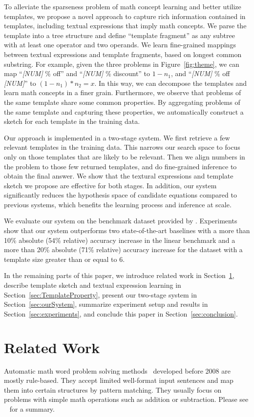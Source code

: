 \documentclass[11pt,letterpaper]{article}
\begin{document}
To alleviate the sparseness problem of math concept learning and better utilize templates, we propose a novel approach to capture rich information contained in templates, including textual expressions that imply math concepts. We parse the template into a tree structure and define ``template fragment'' as any subtree with at least one operator and two operands. We learn fine-grained mappings between textual expressions and template fragments, based on longest common substring. For example, given the three problems in Figure~\ref{fig:theme}, we can map ``\emph{[NUM]} \% off'' and ``\emph{[NUM]} \% discount'' to $1-n_1$, and ``\emph{[NUM]} \% off \emph{[NUM]}'' to $(1-n_1)*n_2=x$. In this way, we can decompose the templates and learn math concepts in a finer grain. Furthermore, we observe that problems of the same template share some common properties. By aggregating problems of the same template and capturing these properties, we automatically construct a sketch for each template in the training data.

Our approach is implemented in a two-stage system. We first retrieve a few relevant templates in the training data. This narrows our search space to focus only on those templates that are likely to be relevant. Then we align numbers in the problem to those few returned templates, and do fine-grained inference to obtain the final answer. We show that the textural expressions and template sketch we propose are effective for both stages. In addition, our system significantly reduces the hypothesis space of candidate equations compared to previous systems, which benefits the learning process and inference at scale.

We evaluate our system on the benchmark dataset provided by . Experiments show that our system outperforms two state-of-the-art baselines with a more than 10\% absolute (54\% relative) accuracy increase in the linear benchmark and a more than 20\% absolute (71\% relative) accuracy increase for the dataset with a template size greater than or equal to 6.

In the remaining parts of this paper, we introduce related work in Section~\ref{sec:relatedwork}, describe template sketch and textual expression learning in Section~\ref{sec:TemplateProperty}, present our two-stage system in Section~\ref{sec:ourSystem}, summarize experiment setup and results in Section~\ref{sec:experiments}, and conclude this paper in Section~\ref{sec:conclusion}.

\section{Related Work}
\label{sec:relatedwork}
Automatic math word problem solving methods~\cite{bobrow1964a,bobrow1964b,Charniak1968,Charniak1969,BriasLarkin1984,Fletcher1985,Dellarosa1986,Bakman2007,Ma2010} developed before 2008 are mostly rule-based. They accept limited well-format input sentences and map them into certain structures by pattern matching. They usually focus on problems with simple math operations such as addition or subtraction. Please see ~ for a summary.
\end{document}
